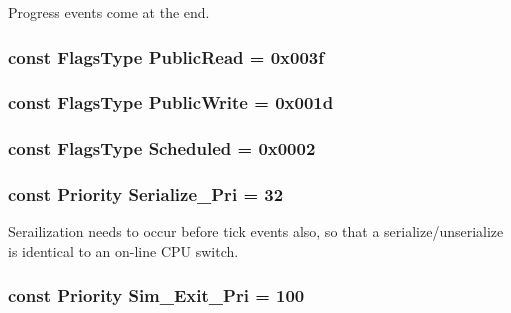 Progress events come at the end. \hypertarget{classEventBase_a7e97bb94f1684b43dd97c646cfdeefd7}{
\subsubsection[{PublicRead}]{\setlength{\rightskip}{0pt plus 5cm}const {\bf FlagsType} {\bf PublicRead} = 0x003f}}
\label{classEventBase_a7e97bb94f1684b43dd97c646cfdeefd7}
\hypertarget{classEventBase_afabddde79b1b676b2e1738700aaf08af}{
\subsubsection[{PublicWrite}]{\setlength{\rightskip}{0pt plus 5cm}const {\bf FlagsType} {\bf PublicWrite} = 0x001d}}
\label{classEventBase_afabddde79b1b676b2e1738700aaf08af}
\hypertarget{classEventBase_ac1b50e524ba5bdbd010654eae3ef982b}{
\subsubsection[{Scheduled}]{\setlength{\rightskip}{0pt plus 5cm}const {\bf FlagsType} {\bf Scheduled} = 0x0002}}
\label{classEventBase_ac1b50e524ba5bdbd010654eae3ef982b}
\hypertarget{classEventBase_aa7968ced91b59b9d8614064d742fb17d}{
\subsubsection[{Serialize\_\-Pri}]{\setlength{\rightskip}{0pt plus 5cm}const {\bf Priority} {\bf Serialize\_\-Pri} = 32}}
\label{classEventBase_aa7968ced91b59b9d8614064d742fb17d}
Serailization needs to occur before tick events also, so that a serialize/unserialize is identical to an on-\/line CPU switch. \hypertarget{classEventBase_a0e91729fc98f99e73e3d13cb18cb123f}{
\subsubsection[{Sim\_\-Exit\_\-Pri}]{\setlength{\rightskip}{0pt plus 5cm}const {\bf Priority} {\bf Sim\_\-Exit\_\-Pri} = 100}}
